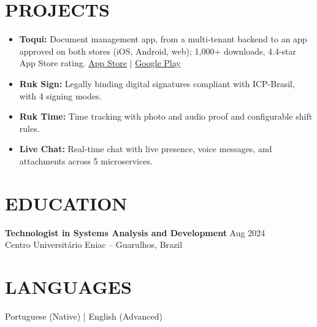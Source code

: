 \documentclass[10pt,letterpaper]{article}
\begin{document}
\section{PROJECTS}
\begin{itemize}[leftmargin=*, itemsep=2pt]
    \item \textbf{Toqui:} Document management app, from a multi-tenant backend to an app approved on both stores (iOS, Android, web); 1,000+ downloads, 4.4-star App Store rating. \href{https://apps.apple.com/br/app/toqui/id6466649690}{App Store} | \href{https://play.google.com/store/apps/details?id=com.toquiapp}{Google Play}
    \item \textbf{Ruk Sign:} Legally binding digital signatures compliant with ICP-Brasil, with 4 signing modes.
    \item \textbf{Ruk Time:} Time tracking with photo and audio proof and configurable shift rules.
    \item \textbf{Live Chat:} Real-time chat with live presence, voice messages, and attachments across 5 microservices.
\end{itemize}

\section{EDUCATION}
\textbf{Technologist in Systems Analysis and Development} \hfill Aug 2024 \\
Centro Universitário Eniac -- Guarulhos, Brazil

\section{LANGUAGES}
Portuguese (Native) \quad | \quad English (Advanced)
\end{document}
